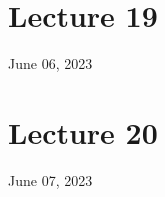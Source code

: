 \documentclass[12pt,fancychapters]{report}
\numberwithin{equation}{section}
\begin{document}
\section{Lecture 19}
June 06, 2023














































\newpage
\section{Lecture 20}
June 07, 2023
\end{document}
